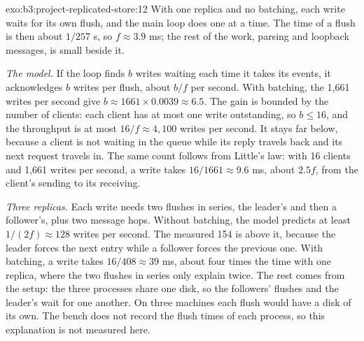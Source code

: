 \begin{solution}{exo:b3:project-replicated-store:12}
With one replica and no batching, each write waits for its own flush, and the main loop does one at a time. The time of a flush is then about $1/257$ s, so $f \approx 3.9$ ms; the rest of the work, parsing and loopback messages, is small beside it.

\emph{The model.} If the loop finds $b$ writes waiting each time it takes its events, it acknowledges $b$ writes per flush, about $b/f$ per second. With batching, the 1,661 writes per second give $b \approx 1661 \times 0.0039 \approx 6.5$. The gain is bounded by the number of clients: each client has at most one write outstanding, so $b \leq 16$, and the throughput is at most $16/f \approx 4{,}100$ writes per second. It stays far below, because a client is not waiting in the queue while its reply travels back and its next request travels in. The same count follows from Little's law: with 16 clients and 1,661 writes per second, a write takes $16/1661 \approx 9.6$ ms, about $2.5f$, from the client's sending to its receiving.

\emph{Three replicas.} Each write needs two flushes in series, the leader's and then a follower's, plus two message hops. Without batching, the model predicts at least $1/(2f) \approx 128$ writes per second. The measured 154 is above it, because the leader forces the next entry while a follower forces the previous one. With batching, a write takes $16/408 \approx 39$ ms, about four times the time with one replica, where the two flushes in series only explain twice. The rest comes from the setup: the three processes share one disk, so the followers' flushes and the leader's wait for one another. On three machines each flush would have a disk of its own. The bench does not record the flush times of each process, so this explanation is not measured here.
\end{solution}

